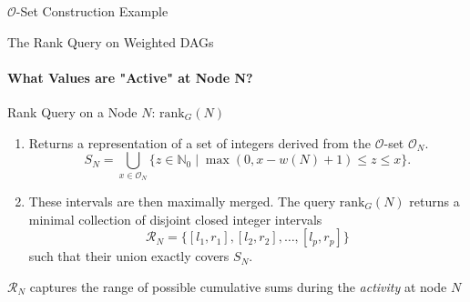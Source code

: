 \begin{frame}{$\mathcal{O}$-Set Construction Example}
\begin{figure}[h!]
{\begin{tikzpicture}
            \end{tikzpicture}
        } %
    \end{figure}
\end{frame}

\begin{frame}{The Rank Query on Weighted DAGs}
    \framesubtitle{What Values are "Active" at Node N?}
    \begin{block}{Rank Query on a Node $N$: $\mathrm{rank}_G(N)$}
        \begin{enumerate}
            \item Returns a representation of a set of integers derived from the $\mathcal{O}$-set $\mathcal{O}_N$.
                  \[ S_N = \bigcup_{x \in \mathcal{O}_N} \{ z \in \mathbb{N}_0 \mid \max(0, x - w(N) + 1) \le z \le x \}. \]
                  \vspace{-1em}
                  \pause
            \item These intervals are then maximally merged. The query $\mathrm{rank}_G(N)$ returns a \alert{minimal collection of disjoint closed integer intervals}
                  \[ \mathcal{R}_N = \{[l_1, r_1], [l_2, r_2], \dots, [l_p, r_p]\} \]
                  such that their union exactly covers $S_N$.
        \end{enumerate}
    \end{block}
    $\mathcal{R}_N$ captures the range of possible cumulative sums during the \emph{activity} at node $N$

\end{frame}
